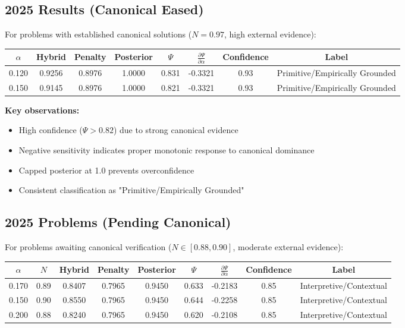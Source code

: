 \documentclass[12pt,a4paper]{article}
\begin{document}
\subsection{2025 Results (Canonical Eased)}

For problems with established canonical solutions ($N = 0.97$, high external evidence):

\begin{center}
\begin{tabular}{@{}cccccccc@{}}
\toprule
$\alpha$ & Hybrid & Penalty & Posterior & $\Psi$ & $\frac{\partial \Psi}{\partial \alpha}$ & Confidence & Label \\
\midrule
0.120 & 0.9256 & 0.8976 & 1.0000 & 0.831 & -0.3321 & 0.93 & Primitive/Empirically Grounded \\
0.150 & 0.9145 & 0.8976 & 1.0000 & 0.821 & -0.3321 & 0.93 & Primitive/Empirically Grounded \\
\bottomrule
\end{tabular}
\end{center}

\textbf{Key observations:}
\begin{itemize}
    \item High confidence ($\Psi > 0.82$) due to strong canonical evidence
    \item Negative sensitivity indicates proper monotonic response to canonical dominance
    \item Capped posterior at 1.0 prevents overconfidence
    \item Consistent classification as "Primitive/Empirically Grounded"
\end{itemize}

\subsection{2025 Problems (Pending Canonical)}

For problems awaiting canonical verification ($N \in [0.88, 0.90]$, moderate external evidence):

\begin{center}
\begin{tabular}{@{}ccccccccc@{}}
\toprule
$\alpha$ & $N$ & Hybrid & Penalty & Posterior & $\Psi$ & $\frac{\partial \Psi}{\partial \alpha}$ & Confidence & Label \\
\midrule
0.170 & 0.89 & 0.8407 & 0.7965 & 0.9450 & 0.633 & -0.2183 & 0.85 & Interpretive/Contextual \\
0.150 & 0.90 & 0.8550 & 0.7965 & 0.9450 & 0.644 & -0.2258 & 0.85 & Interpretive/Contextual \\
0.200 & 0.88 & 0.8240 & 0.7965 & 0.9450 & 0.620 & -0.2108 & 0.85 & Interpretive/Contextual \\
\bottomrule
\end{tabular}
\end{center}
\end{document}
